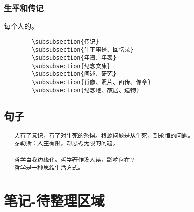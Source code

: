 \documentclass[UTF8]{../RepresentationUniverse}
\begin{document}
\subsection{生平和传记}
    每个人的。
    \begin{lstlisting}
        \subsubsection{传记}
        \subsubsection{生平事迹、回忆录}
        \subsubsection{年谱、年表}
        \subsubsection{纪念文集}
        \subsubsection{阐述、研究}
        \subsubsection{肖像、照片、画传、像章}
        \subsubsection{纪念地、故居、遗物}
    \end{lstlisting}





\section{句子}


\begin{lstlisting}
   人有了意识，有了对生死的恐惧。根源问题是从生死，到永恒的问题。
   泰勒斯：人生有限，却思考无限的问题。

   哲学自我边缘化。哲学著作没人读，影响何在？
   哲学是一种思维生活方式。

\end{lstlisting}

\chapter{笔记-待整理区域}
\end{document}
